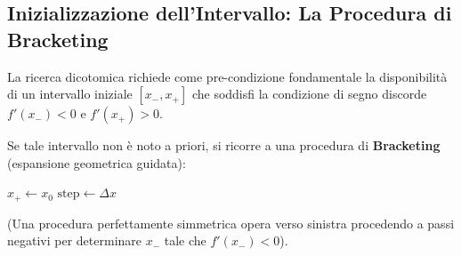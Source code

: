 \subsection{Inizializzazione dell'Intervallo: La Procedura di Bracketing}
La ricerca dicotomica richiede come pre-condizione fondamentale la disponibilit\`a di un intervallo iniziale $[x_-, x_+]$ che soddisfi la condizione di segno discorde $f'(x_-) < 0$ e $f'(x_+) > 0$. 

Se tale intervallo non \`e noto a priori, si ricorre a una procedura di \textbf{Bracketing} (espansione geometrica guidata):

\begin{algorithm}[H]
\caption{Procedura di Bracketing con Espansione Geometrica}
\label{alg:bracketing-espansione}

$x_+ \gets x_0$\;
$\text{step} \gets \Delta x$\;
\;
\end{algorithm}
(Una procedura perfettamente simmetrica opera verso sinistra procedendo a passi negativi per determinare $x_-$ tale che $f'(x_-) < 0$).


